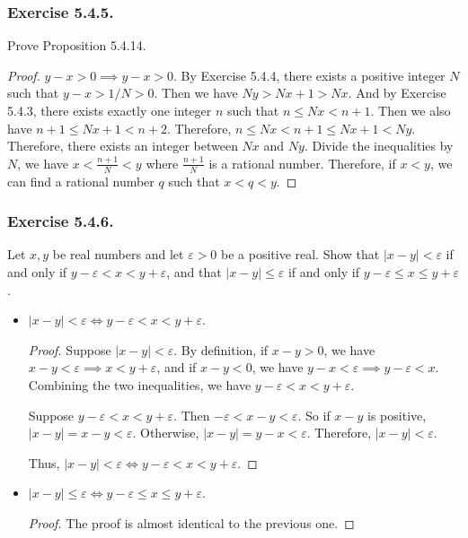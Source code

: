 \documentclass[12pt, letter]{article}
\begin{document}
\subsubsection*{Exercise 5.4.5.}
Prove Proposition 5.4.14.
\begin{proof}
    $y-x>0\implies y-x>0$. By Exercise 5.4.4, there exists a positive integer $N$ such that $y-x>1/N>0$. Then we have $Ny>Nx+1>Nx$. And by Exercise 5.4.3, there exists exactly one integer 
    $n$ such that $n\leq Nx<n+1$. Then we also have $n+1\leq Nx+1<n+2$. Therefore, $n\leq Nx<n+1\leq Nx+1<Ny$. Therefore, there exists an integer between $Nx$ and $Ny$. 
    Divide the inequalities by $N$, we have $x<\frac{n+1}{N}<y$ where $\frac{n+1}{N}$ is a rational number. Therefore, if $x<y$, we can find a rational number $q$ such that $x<q<y$.
\end{proof}
\subsubsection*{Exercise 5.4.6.}
Let $x,y$ be real numbers and let $\varepsilon>0$ be a positive real. Show that $|x-y|<\varepsilon$ if and only if $y-\varepsilon<x<y+\varepsilon$, and that $|x-y|\leq \varepsilon$ if and 
only if $y-\varepsilon\leq x\leq y+\varepsilon$.
\begin{itemize}
    \item $|x-y|<\varepsilon\iff y-\varepsilon<x<y+\varepsilon$.
    \begin{proof}
        Suppose $|x-y|<\varepsilon$. By definition, if $x-y>0$, we have $x-y<\varepsilon\implies x<y+\varepsilon$, and if $x-y<0$, we have $y-x<\varepsilon\implies y-\varepsilon<x$.
        Combining the two inequalities, we have $y-\varepsilon<x<y+\varepsilon$. 

        Suppose $y-\varepsilon<x<y+\varepsilon$. Then $-\varepsilon<x-y<\varepsilon$. So if $x-y$ is positive, $|x-y|=x-y<\varepsilon$. 
        Otherwise, $|x-y|=y-x<\varepsilon$. Therefore, $|x-y|<\varepsilon$.

        Thus, $|x-y|<\varepsilon\iff y-\varepsilon<x<y+\varepsilon$.
    \end{proof}
    \item $|x-y|\leq \varepsilon\iff y-\varepsilon\leq x\leq y+\varepsilon$.
    \begin{proof}
        The proof is almost identical to the previous one. 
    \end{proof}
\end{itemize}
\end{document}
